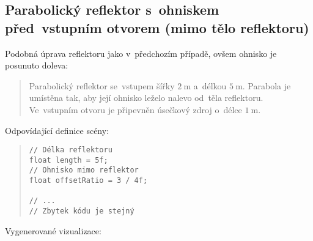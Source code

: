 

\subsection[Parabolický reflektor s~ohniskem před~vstupním otvorem]{Parabolický reflektor s~ohniskem před~vstupním otvorem (mimo tělo reflektoru)}

Podobná úprava reflektoru jako v~předchozím případě, ovšem ohnisko je posunuto doleva:

\begin{quote}
    Parabolický reflektor se~vstupem šířky $2\ \mathrm{m}$ a~délkou $5\ \mathrm{m}$. Parabola je umístěna tak, aby její ohnisko leželo nalevo od~těla reflektoru. Ve~vstupním otvoru je připevněn úsečkový zdroj o~délce $1\ \mathrm{m}$.
\end{quote}

Odpovídající definice scény:

\begin{minipage}{\textwidth}\begin{quote}\begin{lstlisting}
// Délka reflektoru
float length = 5f;
// Ohnisko mimo reflektor
float offsetRatio = 3 / 4f;

// ...
// Zbytek kódu je stejný
\end{lstlisting}\end{quote}\end{minipage}

\beautypage

Vygenerované vizualizace:





